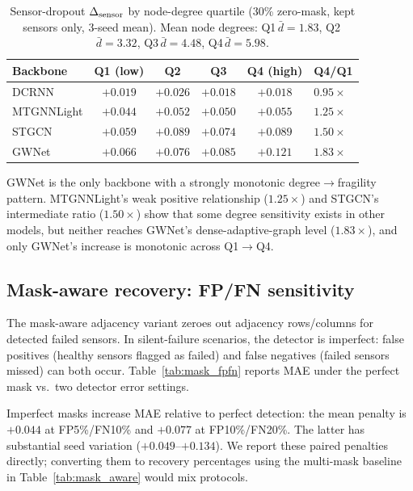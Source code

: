 \begin{table}[h]
\centering
\caption{Sensor-dropout $\Delta_{\text{sensor}}$ by node-degree quartile (30\% zero-mask, kept sensors only, 3-seed mean). Mean node degrees: Q1\,$\bar{d}=1.83$, Q2\,$\bar{d}=3.32$, Q3\,$\bar{d}=4.48$, Q4\,$\bar{d}=5.98$.}
\label{tab:degree_stratification}
\vskip 0.1in
\small
\begin{tabular}{lccccl}
\toprule
\textbf{Backbone} & \textbf{Q1 (low)} & \textbf{Q2} & \textbf{Q3} & \textbf{Q4 (high)} & \textbf{Q4/Q1} \\
\midrule
DCRNN           & $+0.019$ & $+0.026$ & $+0.018$ & $+0.018$ & $0.95\times$ \\
MTGNNLight      & $+0.044$ & $+0.052$ & $+0.050$ & $+0.055$ & $1.25\times$ \\
STGCN           & $+0.059$ & $+0.089$ & $+0.074$ & $+0.089$ & $1.50\times$ \\
GWNet           & $+0.066$ & $+0.076$ & $+0.085$ & $+0.121$ & $1.83\times$ \\
\bottomrule
\end{tabular}
\end{table}

GWNet is the only backbone with a strongly monotonic degree$\to$fragility pattern.
MTGNNLight's weak positive relationship ($1.25\times$) and STGCN's intermediate ratio ($1.50\times$)
show that some degree sensitivity exists in other models, but neither
reaches GWNet's dense-adaptive-graph level ($1.83\times$), and only GWNet's increase is monotonic across
Q1$\to$Q4.

\subsection{Mask-aware recovery: FP/FN sensitivity}
\label{sec:appendix_mask_fpfn}

The mask-aware adjacency variant zeroes out adjacency rows/columns for detected failed sensors.
In silent-failure scenarios, the detector is imperfect: false positives (healthy sensors
flagged as failed) and false negatives (failed sensors missed) can both occur.
Table~\ref{tab:mask_fpfn} reports MAE under the perfect mask vs.\ two detector error settings.

\begin{table}[h]
\centering
\caption{Mask-aware GWNet sensitivity to imperfect detection (3 model seeds).
FP is the fraction of healthy sensors erroneously zeroed in the adjacency;
FN is the fraction of failed sensors missed. Values are the normalized-MAE
increase relative to perfect detection under the same primary mask, reported
as mean $\pm$ population std and median across seeds.}
\label{tab:mask_fpfn}
\vskip 0.1in
\small

\end{table}
Imperfect masks increase MAE relative to perfect detection: the mean penalty
is $+0.044$ at FP5\%/FN10\% and $+0.077$ at FP10\%/FN20\%. The latter
has substantial seed variation ($+0.049$--$+0.134$). We report these paired
penalties directly; converting them to recovery percentages using the
multi-mask baseline in Table~\ref{tab:mask_aware} would mix protocols.

